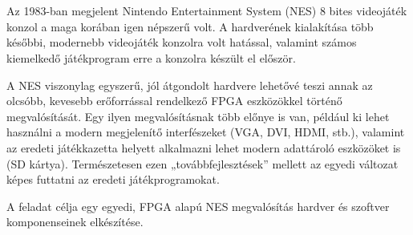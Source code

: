 \chapter{\bevezetes}

Az 1983-ban megjelent Nintendo Entertainment System (NES) 8 bites videojáték konzol a
maga korában igen népszerű volt. A hardverének kialakítása több későbbi, modernebb
videojáték konzolra volt hatással, valamint számos kiemelkedő játékprogram erre a konzolra
készült el először.

A NES viszonylag egyszerű, jól átgondolt hardvere lehetővé teszi annak az olcsóbb, kevesebb
erőforrással rendelkező FPGA eszközökkel történő megvalósítását. Egy ilyen
megvalósításnak több előnye is van, például ki lehet használni a modern megjelenítő
interfészeket (VGA, DVI, HDMI, stb.), valamint az eredeti játékkazetta helyett alkalmazni
lehet modern adattároló eszközöket is (SD kártya). Természetesen ezen „továbbfejlesztések”
mellett az egyedi változat képes futtatni az eredeti játékprogramokat.

A feladat célja egy egyedi, FPGA alapú NES megvalósítás hardver és szoftver
komponenseinek elkészítése. 

